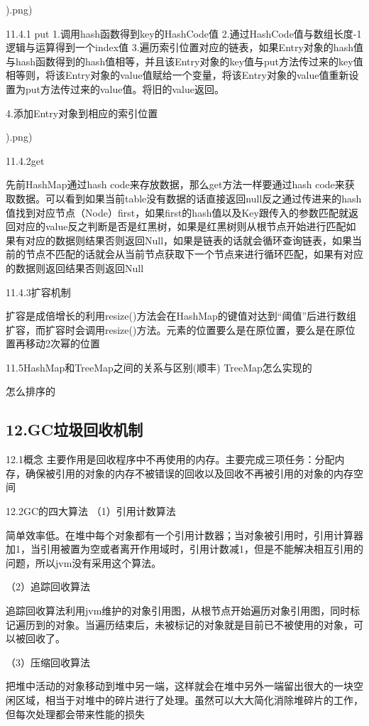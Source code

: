 \documentclass[UTF8]{ctexart}
\begin{document}
).png)

11.4.1 put
1.调用hash函数得到key的HashCode值
2.通过HashCode值与数组长度-1逻辑与运算得到一个index值
3.遍历索引位置对应的链表，如果Entry对象的hash值与hash函数得到的hash值相等，并且该Entry对象的key值与put方法传过来的key值相等则，将该Entry对象的value值赋给一个变量，将该Entry对象的value值重新设置为put方法传过来的value值。将旧的value返回。

4.添加Entry对象到相应的索引位置

).png)

11.4.2get

先前HashMap通过hash code来存放数据，那么get方法一样要通过hash code来获取数据。可以看到如果当前table没有数据的话直接返回null反之通过传进来的hash值找到对应节点（Node）first，如果first的hash值以及Key跟传入的参数匹配就返回对应的value反之判断是否是红黑树，如果是红黑树则从根节点开始进行匹配如果有对应的数据则结果否则返回Null，如果是链表的话就会循环查询链表，如果当前的节点不匹配的话就会从当前节点获取下一个节点来进行循环匹配，如果有对应的数据则返回结果否则返回Null

11.4.3扩容机制

扩容是成倍增长的利用resize()方法会在HashMap的键值对达到“阈值”后进行数组扩容，而扩容时会调用resize()方法。元素的位置要么是在原位置，要么是在原位置再移动2次幂的位置

11.5HashMap和TreeMap之间的关系与区别(顺丰)
TreeMap怎么实现的

怎么排序的

\subsection{12.GC垃圾回收机制}

12.1概念
主要作用是回收程序中不再使用的内存。主要完成三项任务：分配内存，确保被引用的对象的内存不被错误的回收以及回收不再被引用的对象的内存空间

12.2GC的四大算法
（1）引用计数算法

简单效率低。在堆中每个对象都有一个引用计数器；当对象被引用时，引用计算器加1，当引用被置为空或者离开作用域时，引用计数减1，但是不能解决相互引用的问题，所以jvm没有采用这个算法。

（2）追踪回收算法

追踪回收算法利用jvm维护的对象引用图，从根节点开始遍历对象引用图，同时标记遍历到的对象。当遍历结束后，未被标记的对象就是目前已不被使用的对象，可以被回收了。

（3）压缩回收算法

把堆中活动的对象移动到堆中另一端，这样就会在堆中另外一端留出很大的一块空闲区域，相当于对堆中的碎片进行了处理。虽然可以大大简化消除堆碎片的工作，但每次处理都会带来性能的损失
\end{document}
